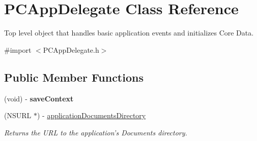 \hypertarget{interface_p_c_app_delegate}{
\section{PCAppDelegate Class Reference}
\label{interface_p_c_app_delegate}
}


Top level object that handles basic application events and initializes Core Data.  




{\ttfamily \#import $<$PCAppDelegate.h$>$}

\subsection*{Public Member Functions}
\begin{DoxyCompactItemize}
\item 
\hypertarget{interface_p_c_app_delegate_a4d53f2b2282faab7f1abe0da589eeb31}{
(void) -\/ {\bfseries saveContext}}
\label{interface_p_c_app_delegate_a4d53f2b2282faab7f1abe0da589eeb31}

\item 
\hypertarget{interface_p_c_app_delegate_a459fff92b0247c4c8be9270049866489}{
(NSURL $\ast$) -\/ \hyperlink{interface_p_c_app_delegate_a459fff92b0247c4c8be9270049866489}{applicationDocumentsDirectory}}
\label{interface_p_c_app_delegate_a459fff92b0247c4c8be9270049866489}

\begin{DoxyCompactList}\small\item\em Returns the URL to the application's Documents directory. \end{DoxyCompactList}\end{DoxyCompactItemize}
